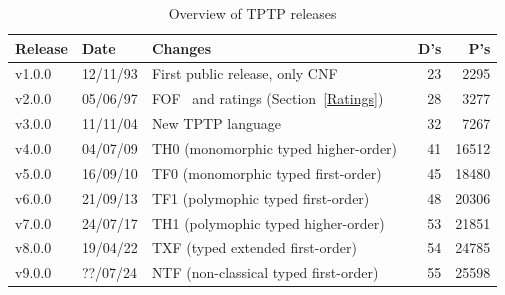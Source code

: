 \documentclass[runningheads]{llncs}
\begin{document}
\begin{table}[htb]
\begin{center}
\setlength{\tabcolsep}{4pt}
\begin{tabular}{ll|l|rr}
Release & Date     & Changes                                              & D's & P's \\
\hline
v1.0.0  & 12/11/93 & First public release, only CNF~\cite{SS98-JAR}       &  23 & 2295 \\
v2.0.0  & 05/06/97 & FOF~\cite{Sut09} and ratings (Section~\ref{Ratings}) &  28 & 3277 \\
v3.0.0  & 11/11/04 & New TPTP language~\cite{SS+06}                       &  32 & 7267 \\
v4.0.0  & 04/07/09 & TH0 (monomorphic typed higher-order)~\cite{SB10}     &  41 & 16512 \\
v5.0.0  & 16/09/10 & TF0 (monomorphic typed first-order)~\cite{SS+12}     &  45 & 18480 \\
v6.0.0  & 21/09/13 & TF1 (polymophic typed first-order)~\cite{BP13-TFF1}  &  48 & 20306 \\
v7.0.0  & 24/07/17 & TH1 (polymophic typed higher-order)~\cite{KSR16}     &  53 & 21851 \\
v8.0.0  & 19/04/22 & TXF (typed extended first-order)~\cite{SK18}         &  54 & 24785 \\
v9.0.0  & ??/07/24 & NTF (non-classical typed first-order)~\cite{SF+22}   &  55 & 25598 \\
\end{tabular}
\end{center}
\caption{Overview of TPTP releases}
\label{tab:Releases}
\end{table}
\end{document}
